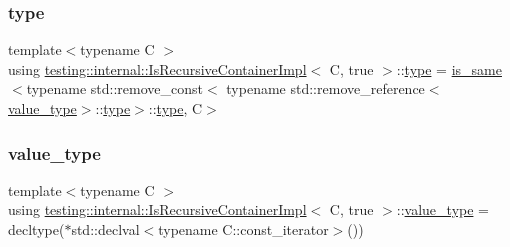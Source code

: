 \subsubsection{\texorpdfstring{type}{type}\hspace{0.1cm}{\footnotesize\ttfamily [2/2]}}
{\footnotesize\ttfamily template$<$typename C $>$ \\
using \mbox{\hyperlink{structtesting_1_1internal_1_1_is_recursive_container_impl}{testing\+::internal\+::\+Is\+Recursive\+Container\+Impl}}$<$ C, true $>$\+::\mbox{\hyperlink{structtesting_1_1internal_1_1_is_recursive_container_impl_3_01_c_00_01true_01_4_a24b611fbe1b9a7c524ee54ae01324388}{type}} =  \mbox{\hyperlink{structtesting_1_1internal_1_1is__same}{is\+\_\+same}}$<$typename std\+::remove\+\_\+const$<$ typename std\+::remove\+\_\+reference$<$\mbox{\hyperlink{structtesting_1_1internal_1_1_is_recursive_container_impl_3_01_c_00_01true_01_4_a5e8e2cf58f0d2581e9e3ab5f5630cd61}{value\+\_\+type}}$>$\+::\mbox{\hyperlink{structtesting_1_1internal_1_1_is_recursive_container_impl_3_01_c_00_01true_01_4_a24b611fbe1b9a7c524ee54ae01324388}{type}}$>$\+::\mbox{\hyperlink{structtesting_1_1internal_1_1_is_recursive_container_impl_3_01_c_00_01true_01_4_a24b611fbe1b9a7c524ee54ae01324388}{type}}, C$>$}

\mbox{\label{structtesting_1_1internal_1_1_is_recursive_container_impl_3_01_c_00_01true_01_4_a5e8e2cf58f0d2581e9e3ab5f5630cd61}} 
\subsubsection{\texorpdfstring{value\_type}{value\_type}\hspace{0.1cm}{\footnotesize\ttfamily [1/2]}}
{\footnotesize\ttfamily template$<$typename C $>$ \\
using \mbox{\hyperlink{structtesting_1_1internal_1_1_is_recursive_container_impl}{testing\+::internal\+::\+Is\+Recursive\+Container\+Impl}}$<$ C, true $>$\+::\mbox{\hyperlink{structtesting_1_1internal_1_1_is_recursive_container_impl_3_01_c_00_01true_01_4_a5e8e2cf58f0d2581e9e3ab5f5630cd61}{value\+\_\+type}} =  decltype($\ast$std\+::declval$<$typename C\+::const\+\_\+iterator$>$())}

